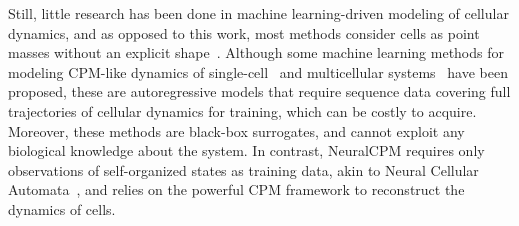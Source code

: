 Still, little research has been done in machine learning-driven modeling of cellular dynamics, and as opposed to this work, most methods consider cells as point masses without an explicit shape~\cite{lachance2022, Yang2024}. Although some machine learning methods for modeling CPM-like dynamics of single-cell~\cite{minartz2022towards} and multicellular systems~\cite{Minartz2024EPNS} have been proposed, these are autoregressive models that require sequence data covering full trajectories of cellular dynamics for training, which can be costly to acquire. Moreover, these methods are black-box surrogates, and cannot exploit any biological knowledge about the system. In contrast, NeuralCPM requires only observations of self-organized states as training data, akin to Neural Cellular Automata~\cite{mordvintsev2020growing}, and relies on the powerful CPM framework to reconstruct the dynamics of cells. 

